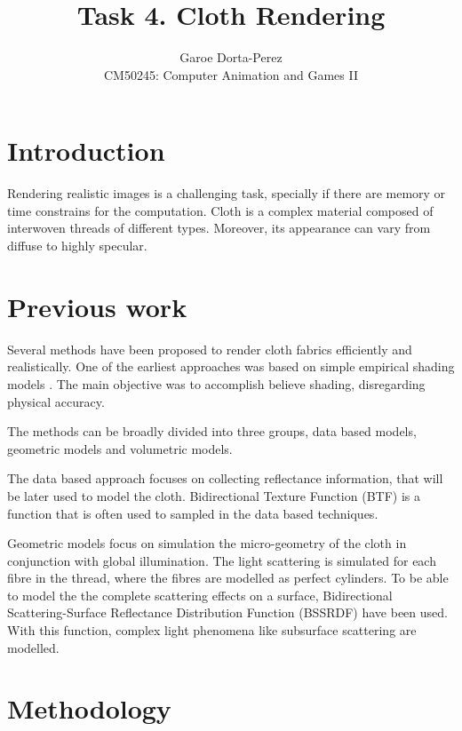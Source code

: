 \documentclass[12pt]{article}
\begin{document}
  
\title{Task 4. Cloth Rendering}
\author{Garoe Dorta-Perez\\
CM50245: Computer Animation and Games II}
 
\maketitle
 
\section{Introduction}

Rendering realistic images is a challenging task, specially if there are memory or time constrains for the computation.
Cloth is a complex material composed of interwoven threads of different types.
Moreover, its appearance can vary from diffuse to highly specular.

\section{Previous work}

Several methods have been proposed to render cloth fabrics efficiently and realistically.
One of the earliest approaches was based on simple empirical shading models \cite{Weft1986}.
The main objective was to accomplish believe shading, disregarding physical accuracy.

The methods can be broadly divided into three groups, data based models, geometric models and volumetric models.

The data based approach focuses on collecting reflectance information, that will be later used to model the cloth.
Bidirectional Texture Function (BTF) \cite{Dana1999} is a function that is often used to sampled in the data based techniques.

Geometric models focus on simulation the micro-geometry of the cloth in conjunction with global illumination.
The light scattering is simulated for each fibre in the thread, where the fibres are modelled as perfect cylinders.
To be able to model the the complete scattering effects on a surface, Bidirectional Scattering-Surface Reflectance Distribution Function (BSSRDF) \cite{NicodemusFredEandRichmond1977} have been used.
With this function, complex light phenomena like subsurface scattering are modelled.

\section{Methodology}
\end{document}
